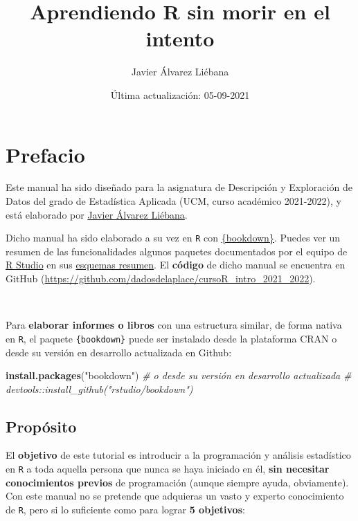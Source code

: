 \documentclass[11pt,]{book}
\title{Aprendiendo R sin morir en el intento}
\author{Javier Álvarez Liébana}
\date{Última actualización: 05-09-2021}
\newenvironment{Shaded}{\begin{snugshade}}{\end{snugshade}}
\newcommand{\CommentTok}[1]{\textcolor[rgb]{0.37,0.37,0.37}{\textit{#1}}}
\newcommand{\KeywordTok}[1]{\textcolor[rgb]{0.27,0.27,0.27}{\textbf{#1}}}
\newcommand{\NormalTok}[1]{#1}
\newcommand{\StringTok}[1]{\textcolor[rgb]{0.5,0.5,0.5}{#1}}
\begin{document}
\maketitle

{
\hypersetup{linkcolor=}
\setcounter{tocdepth}{2}
\tableofcontents
}
\listoftables
\listoffigures
\hypertarget{prefacio}{%
\chapter*{Prefacio}\label{prefacio}}


Este manual ha sido diseñado para la asignatura de Descripción y Exploración de Datos del grado de Estadística Aplicada (UCM, curso académico 2021-2022), y está elaborado por \href{twitter.com/dadosdelaplace}{Javier Álvarez Liébana}.

Dicho manual ha sido elaborado a su vez en \texttt{R} con \href{https://github.com/rstudio/bookdown}{\{bookdown\}}. Puedes ver un resumen de las funcionalidades algunos paquetes documentados por el equipo de \href{https://www.rstudio.com/}{R Studio} en sus \href{https://www.rstudio.com/resources/cheatsheets/}{esquemas resumen}. El \textbf{código} de dicho manual se encuentra en GitHub (\url{https://github.com/dadosdelaplace/cursoR_intro_2021_2022}).

~

Para \textbf{elaborar informes o libros} con una estructura similar, de forma nativa en \texttt{R}, el paquete \texttt{\{bookdown\}} puede ser instalado desde la plataforma CRAN o desde su versión en desarrollo actualizada en Github:

\begin{Shaded}
\begin{Highlighting}[]
\KeywordTok{install.packages}\NormalTok{(}\StringTok{"bookdown"}\NormalTok{)}
\CommentTok{# o desde su versión en desarrollo actualizada}
\CommentTok{# devtools::install_github("rstudio/bookdown")}
\end{Highlighting}
\end{Shaded}

\hypertarget{propuxf3sito}{%
\section*{Propósito}\label{propuxf3sito}}


El \textbf{objetivo} de este tutorial es introducir a la programación y análisis estadístico en \texttt{R} a toda aquella persona que nunca se haya iniciado en él, \textbf{sin necesitar conocimientos previos} de programación (aunque siempre ayuda, obviamente). Con este manual no se pretende que adquieras un vasto y experto conocimiento de \texttt{R}, pero si lo suficiente como para lograr \textbf{5 objetivos}:
\end{document}
